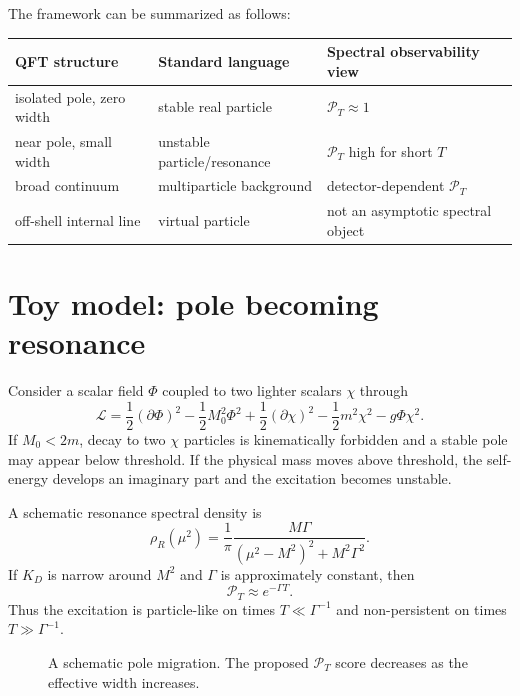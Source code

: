 \documentclass[11pt]{article}
\theoremstyle{remark}
\begin{document}
The framework can be summarized as follows:
\begin{center}
\begin{tabular}{lll}
\hline
QFT structure & Standard language & Spectral observability view\\
\hline
isolated pole, zero width & stable real particle & $\mathcal P_T\approx1$\\
near pole, small width & unstable particle/resonance & $\mathcal P_T$ high for short $T$\\
broad continuum & multiparticle background & detector-dependent $\mathcal P_T$\\
off-shell internal line & virtual particle & not an asymptotic spectral object\\
\hline
\end{tabular}
\end{center}

\section{Toy model: pole becoming resonance}

Consider a scalar field $\Phi$ coupled to two lighter scalars $\chi$ through
\begin{equation}
\mathcal L=\frac12(\partial\Phi)^2-\frac12M_0^2\Phi^2+\frac12(\partial\chi)^2-\frac12m^2\chi^2-g\Phi\chi^2.
\end{equation}
If $M_0<2m$, decay to two $\chi$ particles is kinematically forbidden and a stable pole may appear below threshold. If the physical mass moves above threshold, the self-energy develops an imaginary part and the excitation becomes unstable.

A schematic resonance spectral density is
\begin{equation}
\rho_R(\mu^2)=\frac{1}{\pi}\frac{M\Gamma}{(\mu^2-M^2)^2+M^2\Gamma^2}.
\end{equation}
If $K_D$ is narrow around $M^2$ and $\Gamma$ is approximately constant, then
\begin{equation}
\mathcal P_T\approx e^{-\Gamma T}.
\end{equation}
Thus the excitation is particle-like on times $T\ll\Gamma^{-1}$ and non-persistent on times $T\gg\Gamma^{-1}$.

\begin{figure}[h]
\centering
{}
\caption{A schematic pole migration. The proposed $\mathcal P_T$ score decreases as the effective width increases.}
\end{figure}
\end{document}
